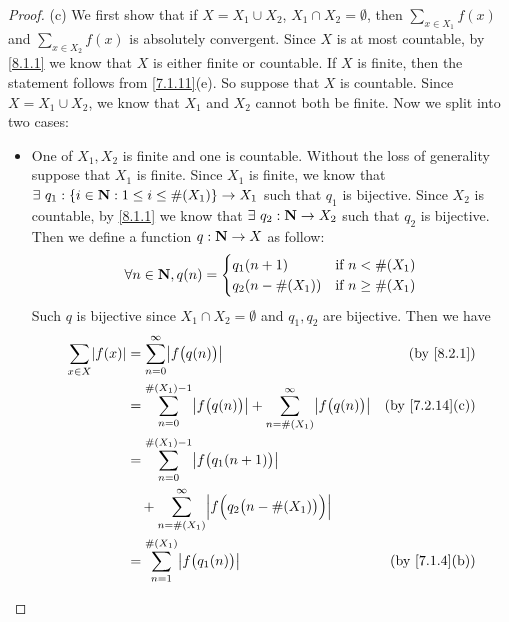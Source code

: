 \begin{proof}{(c)}
  We first show that if \(X = X_1 \cup X_2\), \(X_1 \cap X_2 = \emptyset\), then \(\sum_{x \in X_1} f(x)\) and \(\sum_{x \in X_2} f(x)\) is absolutely convergent.
  Since \(X\) is at most countable, by \cref{8.1.1} we know that \(X\) is either finite or countable.
  If \(X\) is finite, then the statement follows from \cref{7.1.11}(e).
  So suppose that \(X\) is countable.
  Since \(X = X_1 \cup X_2\), we know that \(X_1\) and \(X_2\) cannot both be finite.
  Now we split into two cases:
  \begin{itemize}
    \item One of \(X_1, X_2\) is finite and one is countable.
          Without the loss of generality suppose that \(X_1\) is finite.
          Since \(X_1\) is finite, we know that \(\exists\ q_1 : \{i \in \mathbf{N} : 1 \leq i \leq \#(X_1)\} \to X_1\) such that \(q_1\) is bijective.
          Since \(X_2\) is countable, by \cref{8.1.1} we know that \(\exists\ q_2 : \mathbf{N} \to X_2\) such that \(q_2\) is bijective.
          Then we define a function \(q : \mathbf{N} \to X\) as follow:
          \[
            \forall n \in \mathbf{N}, q(n) = \begin{cases}
              q_1(n + 1)       & \text{if } n < \#(X_1)    \\
              q_2(n - \#(X_1)) & \text{if } n \geq \#(X_1)
            \end{cases}
          \]
          Such \(q\) is bijective since \(X_1 \cap X_2 = \emptyset\) and \(q_1, q_2\) are bijective.
          Then we have
          \begin{align*}
            \sum_{x \in X} \abs{f(x)} & = \sum_{n = 0}^\infty \abs{f\big(q(n)\big)}                                                          & \text{(by \cref{8.2.1})}     \\
                                      & = \sum_{n = 0}^{\#(X_1) - 1} \abs{f\big(q(n)\big)} + \sum_{n = \#(X_1)}^\infty \abs{f\big(q(n)\big)} & \text{(by \cref{7.2.14}(c))} \\
                                      & = \sum_{n = 0}^{\#(X_1) - 1} \abs{f\big(q_1(n + 1)\big)}                                                                            \\
                                      & \quad + \sum_{n = \#(X_1)}^\infty \abs{f\Big(q_2\big(n - \#(X_1)\big)\Big)}                                                         \\
                                      & = \sum_{n = 1}^{\#(X_1)} \abs{f\big(q_1(n)\big)}                                                     & \text{(by \cref{7.1.4}(b))}  \\

\end{align*}
\end{itemize}
\end{proof}
